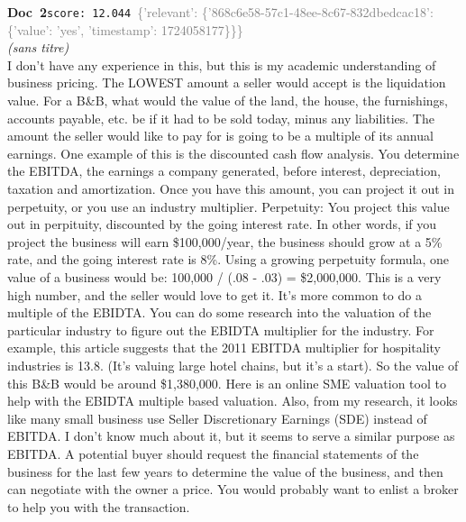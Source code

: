 \documentclass[a4paper,11pt]{article}
\begin{document}
\begin{docenv}
{\footnotesize\textcolor{doccolor}{\textbf{Doc~2}}}\hfill{\tiny\texttt{score:~12.044}}\ {\tiny\textcolor{gray}{\{'relevant': \{'868c6e58-57c1-48ee-8c67-832dbedcac18': \{'value': 'yes', 'timestamp': 1724058177\}\}\}}}\\[3pt]
{\small\textit{(sans titre)}}\\[2pt]
\vspace{2pt}
{\footnotesize 
I don't have any experience in this, but this is my academic understanding of business pricing.  The LOWEST amount a seller would accept is the liquidation value. For a B\&B, what would the value of the land, the house, the furnishings, accounts payable, etc. be if it had to be sold today, minus any liabilities.  The amount the seller would like to pay for is going to be a multiple of its annual earnings. One example of this is the discounted cash flow analysis. You determine the EBITDA, the earnings a company generated, before interest,  depreciation, taxation and amortization.  Once you have this amount, you can project it out in perpetuity, or you use an industry multiplier.  Perpetuity:  You project this value out in perpituity, discounted by the going interest rate. In other words, if you project the business will earn \$100,000/year, the business should grow at a 5\% rate, and the going interest rate is 8\%. Using a growing perpetuity formula, one value of a business would be: 100,000 / (.08 - .03) = \$2,000,000.  This is a very high number, and the seller would love to get it.  It's more common to do a multiple of the EBIDTA. You can do some research into the valuation of the particular industry to figure out the EBIDTA multiplier for the industry. For example, this article suggests that the 2011 EBITDA multiplier for hospitality industries is 13.8. (It's valuing large hotel chains, but it's a start). So the value of this B\&B would be around \$1,380,000. Here is an online SME valuation tool to help with the EBIDTA multiple based valuation. Also, from my research, it looks like many small business use Seller Discretionary Earnings  (SDE) instead of EBITDA. I don't know much about it, but it seems to serve a similar purpose as EBITDA.  A potential buyer should request the financial statements of the business for the last few years to determine the value of the business, and then can negotiate with the owner a price. You would probably want to enlist a broker to help you with the transaction.}
\end{docenv}
\end{document}
